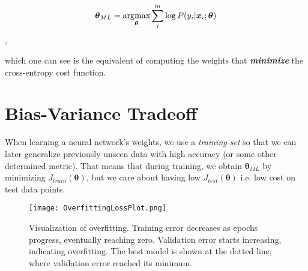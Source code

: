 \[\bm{\theta}_{ML} = \operatorname*{\arg\!\max}_{\bm{\theta}} \sum_{i}^{m} \log P(y_{i}|\bm{x}_{i};\bm{\theta})\],

which one can see is the equivalent of computing the weights that \textbf{\textit{minimize}} the cross-entropy cost function.




\section{Bias-Variance Tradeoff}
When learning a neural network's weights, we use a \textit{training set} so that we can later generalize
previously unseen data with high accuracy (or some other determined metric). That means that during training, we
obtain $\bm{\theta}_{ML}$ by minimizing $J_{train}(\bm{\theta})$, but we care about having low $J_{test}(\bm{\theta})$ i.e. low cost
on test data points.

\begin{figure}[h]
\caption{Visualization of overfitting. Training error decreases as epochs progress, eventually reaching zero.
Validation error starts increasing, indicating overfitting. The best model is shown at the dotted line, where
validation error reached its minimum.}
\centering
\texttt{[image: OverfittingLossPlot.png]}
\end{figure}


